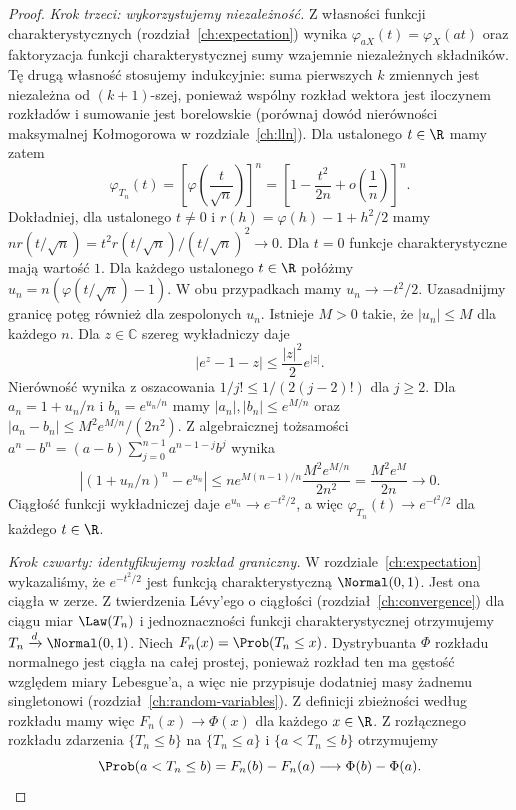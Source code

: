 \begin{proof}
\emph{Krok trzeci: wykorzystujemy niezależność.}
Z własności funkcji charakterystycznych
(rozdział~\ref{ch:expectation}) wynika
$\varphi_{aX}(t)=\varphi_X(at)$ oraz faktoryzacja
funkcji charakterystycznej sumy wzajemnie niezależnych
składników. Tę drugą własność stosujemy indukcyjnie:
suma pierwszych $k$ zmiennych jest niezależna od
$(k+1)$-szej, ponieważ wspólny rozkład wektora
jest iloczynem rozkładów i sumowanie jest borelowskie
(porównaj dowód nierówności maksymalnej Kołmogorowa
w rozdziale~\ref{ch:lln}).
Dla ustalonego $t\in\R$ mamy zatem
\[
\varphi_{T_n}(t)
=\left[\varphi\!\left(\frac{t}{\sqrt n}\right)\right]^n
=\left[1-\frac{t^2}{2n}+o\!\left(\frac1n\right)\right]^n.
\]
Dokładniej, dla ustalonego $t\ne0$ i
$r(h)=\varphi(h)-1+h^2/2$ mamy
$n r(t/\sqrt n)=t^2 r(t/\sqrt n)/(t/\sqrt n)^2\to0$.
Dla $t=0$ funkcje charakterystyczne mają wartość $1$.
Dla każdego ustalonego $t\in\R$ połóżmy
$u_n=n(\varphi(t/\sqrt n)-1)$.
W obu przypadkach mamy $u_n\to-t^2/2$.
Uzasadnijmy granicę potęg również dla zespolonych $u_n$.
Istnieje $M>0$ takie, że $|u_n|\leq M$ dla każdego $n$.
Dla $z\in\mathbb C$ szereg wykładniczy daje
\[
|e^z-1-z|\leq\frac{|z|^2}{2}e^{|z|}.
\]
Nierówność wynika z oszacowania
$1/j!\leq1/(2(j-2)!)$ dla $j\geq2$.
Dla $a_n=1+u_n/n$ i $b_n=e^{u_n/n}$ mamy
$|a_n|,|b_n|\leq e^{M/n}$ oraz
$|a_n-b_n|\leq M^2e^{M/n}/(2n^2)$.
Z algebraicznej tożsamości
$a^n-b^n=(a-b)\sum_{j=0}^{n-1}a^{n-1-j}b^j$
wynika
\[
|(1+u_n/n)^n-e^{u_n}|
\leq n e^{M(n-1)/n}\frac{M^2e^{M/n}}{2n^2}
=\frac{M^2e^M}{2n}\longrightarrow0.
\]
Ciągłość funkcji wykładniczej daje
$e^{u_n}\to e^{-t^2/2}$, a więc
$\varphi_{T_n}(t)\to e^{-t^2/2}$ dla każdego $t\in\R$.

\emph{Krok czwarty: identyfikujemy rozkład graniczny.}
W rozdziale~\ref{ch:expectation} wykazaliśmy, że
$e^{-t^2/2}$ jest funkcją charakterystyczną
$\Normal(0,1)$. Jest ona ciągła w zerze.
Z twierdzenia Lévy'ego o ciągłości
(rozdział~\ref{ch:convergence}) dla ciągu miar
$\Law(T_n)$ i jednoznaczności funkcji charakterystycznej
otrzymujemy $T_n\xrightarrow d\Normal(0,1)$.
Niech $F_n(x)=\Prob(T_n\leq x)$.
Dystrybuanta $\Phi$ rozkładu normalnego jest ciągła
na całej prostej, ponieważ rozkład ten ma gęstość
względem miary Lebesgue'a, a więc nie przypisuje
dodatniej masy żadnemu singletonowi
(rozdział~\ref{ch:random-variables}).
Z definicji zbieżności według rozkładu mamy więc
$F_n(x)\to\Phi(x)$ dla każdego $x\in\R$.
Z rozłącznego rozkładu zdarzenia $\{T_n\leq b\}$
na $\{T_n\leq a\}$ i $\{a<T_n\leq b\}$ otrzymujemy
\[
\Prob(a<T_n\leq b)=F_n(b)-F_n(a)
\longrightarrow\Phi(b)-\Phi(a).
\]
\end{proof}

